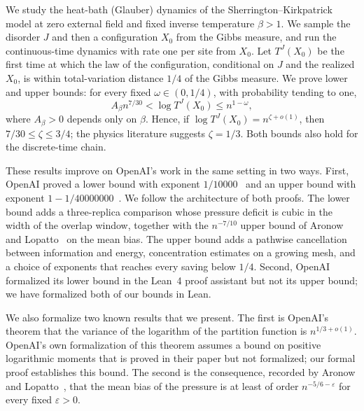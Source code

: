 We study the heat-bath (Glauber) dynamics of the Sherrington--Kirkpatrick
model at zero external field and fixed inverse temperature $\beta>1$. We
sample the disorder $J$ and then a configuration $X_0$ from the Gibbs
measure, and run the continuous-time dynamics with rate one per site from
$X_0$. Let $T^J(X_0)$ be the first time at which the law of the configuration,
conditional on $J$ and the realized $X_0$, is within total-variation distance
$1/4$ of the Gibbs measure. We prove lower
and upper bounds: for every fixed $\omega\in(0,1/4)$, with probability tending
to one,
\[
 A_\beta n^{7/30}<\log T^J(X_0)\le n^{1-\omega},
\]
where $A_\beta>0$ depends only on $\beta$. Hence, if
$\log T^J(X_0)=n^{\zeta+o(1)}$, then $7/30\le\zeta\le3/4$; the physics
literature suggests $\zeta=1/3$. Both bounds also hold for the discrete-time
chain.

These results improve on OpenAI's work in the same setting in two ways.
First, OpenAI proved a lower bound with exponent $1/10000$~\cite[Theorem~1.1]{oai-barriers} and an upper bound
with exponent $1-1/40000000$~\cite[Theorem~1]{oai-typical-upper}. We follow
the architecture of both proofs. The lower bound adds a three-replica
comparison whose pressure deficit is cubic in the width of the overlap window,
together with the $n^{-7/10}$ upper bound of Aronow and
Lopatto~\cite[Theorem~1.1]{hexagon-bias} on the mean bias. The upper bound adds a pathwise cancellation between information and
energy, concentration estimates on a growing mesh, and a choice of exponents
that reaches every saving below $1/4$. Second, OpenAI formalized its lower
bound in the Lean~4 proof assistant but not its upper bound; we have
formalized both of our bounds in Lean.

We also formalize two known results that we present. The first is OpenAI's
theorem that the variance of the logarithm of the partition function is
$n^{1/3+o(1)}$. OpenAI's own formalization of this theorem assumes a bound on
positive logarithmic moments that is proved in their paper but not
formalized; our formal proof establishes this bound. The second is the
consequence, recorded by Aronow and Lopatto~\cite[Section~1.6]{hexagon-bias},
that the mean bias of the pressure is at least of order $n^{-5/6-\varepsilon}$ for every fixed
$\varepsilon>0$.
